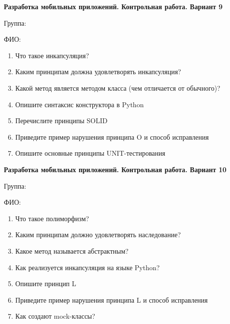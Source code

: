 \documentclass[12pt]{article}
\begin{document}
\vspace{40pt}\begin{minipage}{\textwidth}
\textbf{Разработка мобильных приложений. Контрольная работа. Вариант 9}

Группа: \underline{\hspace{3cm}}

ФИО: \underline{\hspace{10cm}}

\begin{enumerate}
\item Что такое инкапсуляция?
\item Каким принципам должна удовлетворять инкапсуляция?
\item Какой метод является методом класса (чем отличается от обычного)?
\item Опишите синтаксис конструктора в Python
\item Перечислите принципы SOLID
\item Приведите пример нарушения принципа O и способ исправления
\item Опишите основные принципы UNIT-тестирования

\end{enumerate}
\end{minipage}

\vspace{40pt}\begin{minipage}{\textwidth}
\textbf{Разработка мобильных приложений. Контрольная работа. Вариант 10}

Группа: \underline{\hspace{3cm}}

ФИО: \underline{\hspace{10cm}}

\begin{enumerate}
\item Что такое полиморфизм?
\item Каким принципам должно удовлетворять наследование?
\item Какое метод называется абстрактным?
\item Как реализуется инкапсуляция на языке Python?
\item Опишите принцип L
\item Приведите пример нарушения принципа L и способ исправления
\item Как создают mock-классы?

\end{enumerate}
\end{minipage}
\end{document}
